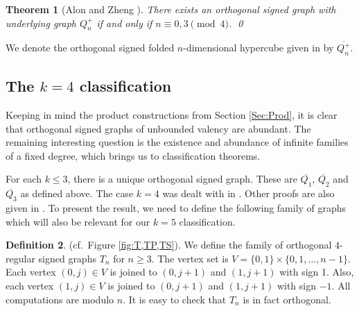 \documentclass[11pt]{article}
\theoremstyle{plain}
\newtheorem{theorem}{Theorem}[section]
\theoremstyle{definition}
\newtheorem{definition}[theorem]{Definition}
\begin{document}
\begin{theorem}[Alon and Zheng \cite{Al}]\label{folded}
There exists an orthogonal signed graph with underlying graph  $Q_n^+$ if and only if $n\equiv 0,3  \pmod{4}$. \qed
\end{theorem}

We denote the orthogonal signed  folded $n$-dimensional  hypercube given in \cite{Al} by $\overline{Q_n^+}$.



\subsection{The $k=4$ classification}

Keeping in mind the product constructions from Section \ref{Sec:Prod}, it is clear that orthogonal signed graphs of unbounded valency are abundant. The remaining interesting question is the existence and abundance of infinite families of a fixed degree, which brings us to  classification theorems. 

For each $k\leqslant3$, there is a unique orthogonal signed graph.  These are  $\overline{Q_1}$, $\overline{Q_2}$ and $\overline{Q_3}$ as defined above.
The case  $k=4$ was dealt with in \cite{MK}. Other proofs are also given in \cite{Gh,Ho}. To present the result, we need to define the following family of graphs which will also be relevant for our $k=5$ classification.


\begin{definition}\label{defT2n} (cf.~Figure \ref{fig:T,TP,TS}).
We define the  family of orthogonal $4$-regular signed graphs $T_{n}$ for $n\geqslant 3$. The vertex set is $V=\{0,1\}\times\{0,1,\ldots,n-1\}$.
 Each vertex $(0,j)\in V$ is joined to
$(0,j+1)$ and  $(1,j+1)$ with sign 1.  Also,   each vertex $(1,j)\in V$ is joined to
$(0,j+1)$ and  $(1,j+1)$ with sign $-1$.
All computations are modulo $n$.
It is easy to check that $T_{n}$ is in fact orthogonal.
\end{definition}
\end{document}
